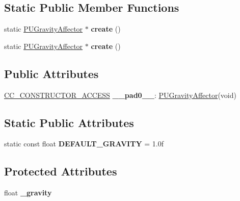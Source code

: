\subsection*{Static Public Member Functions}
\begin{DoxyCompactItemize}
\item 
\mbox{\label{classPUGravityAffector_aa07ef09c404d2fc5042af07200ed1dff}} 
static \hyperlink{classPUGravityAffector}{P\+U\+Gravity\+Affector} $\ast$ {\bfseries create} ()
\item 
\mbox{\label{classPUGravityAffector_a5987becfba4dd473c826d6270c459fd9}} 
static \hyperlink{classPUGravityAffector}{P\+U\+Gravity\+Affector} $\ast$ {\bfseries create} ()
\end{DoxyCompactItemize}
\subsection*{Public Attributes}
\begin{DoxyCompactItemize}
\item 
\mbox{\label{classPUGravityAffector_a4951364274097eb7ea337107c5b90ae4}} 
\hyperlink{_2cocos2d_2cocos_2base_2ccConfig_8h_a25ef1314f97c35a2ed3d029b0ead6da0}{C\+C\+\_\+\+C\+O\+N\+S\+T\+R\+U\+C\+T\+O\+R\+\_\+\+A\+C\+C\+E\+SS} {\bfseries \+\_\+\+\_\+pad0\+\_\+\+\_\+}\+: \hyperlink{classPUGravityAffector}{P\+U\+Gravity\+Affector}(void)
\end{DoxyCompactItemize}
\subsection*{Static Public Attributes}
\begin{DoxyCompactItemize}
\item 
\mbox{\label{classPUGravityAffector_adb743d945228c43ceb3d95089c8088cd}} 
static const float {\bfseries D\+E\+F\+A\+U\+L\+T\+\_\+\+G\+R\+A\+V\+I\+TY} = 1.\+0f
\end{DoxyCompactItemize}
\subsection*{Protected Attributes}
\begin{DoxyCompactItemize}
\item 
\mbox{\label{classPUGravityAffector_a5bfa8d60d03504f2f087e4d5efd1aaad}} 
float {\bfseries \+\_\+gravity}
\end{DoxyCompactItemize}
